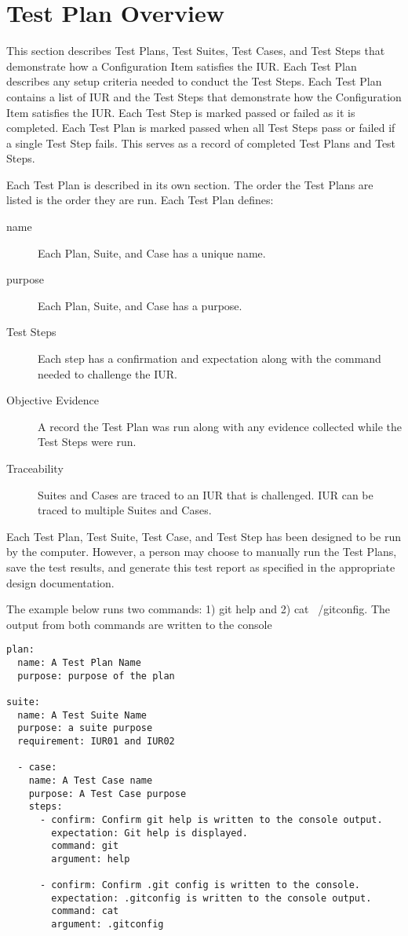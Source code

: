 \newpage
\section{Test Plan Overview}
This section describes Test Plans, Test Suites, Test Cases, and Test Steps that
demonstrate how a Configuration Item satisfies the IUR.  Each Test Plan
describes any setup criteria needed to conduct the Test Steps. Each Test Plan
contains a list of IUR and the Test Steps that demonstrate how the Configuration
Item satisfies the IUR. Each Test Step is marked passed or failed as it is
completed.  Each Test Plan is marked passed when all Test Steps pass or failed
if a single Test Step fails.  This serves as a record of completed Test Plans
and Test Steps.

Each Test Plan is described in its own section.  The order the Test Plans
are listed is the order they are run.  Each Test Plan defines:
\begin{description}

\item[name] \quad Each Plan, Suite, and Case has a unique name.

\item[purpose] \quad Each Plan, Suite, and Case has a purpose.

\item[Test Steps] \quad Each step has a confirmation and expectation along with
  the command needed to challenge the IUR.

\item[Objective Evidence] \quad
A record the Test Plan was run along with any evidence collected while
the Test Steps were run.

\item[Traceability] \quad
Suites and Cases are traced to an IUR that is challenged. IUR can be traced to
multiple Suites and Cases.

\end{description}

Each Test Plan, Test Suite, Test Case,  and Test Step has been designed to be
run by the computer. However, a person may choose to manually run the Test
Plans, save the test results, and generate this test report as specified in the
appropriate design documentation.

The example below runs two commands: 1) git help and 2) cat ~/gitconfig.  The
output from both commands are written to the console

\begin{lstlisting}
plan:
  name: A Test Plan Name
  purpose: purpose of the plan

suite:
  name: A Test Suite Name
  purpose: a suite purpose
  requirement: IUR01 and IUR02

  - case:
    name: A Test Case name
    purpose: A Test Case purpose
    steps:
      - confirm: Confirm git help is written to the console output.
        expectation: Git help is displayed.
        command: git
        argument: help

      - confirm: Confirm .git config is written to the console.
        expectation: .gitconfig is written to the console output.
        command: cat
        argument: .gitconfig
\end{lstlisting}
